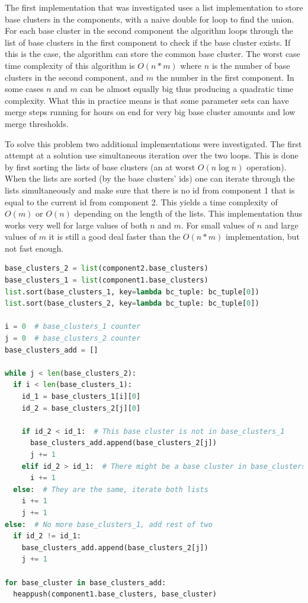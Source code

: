 The first implementation that was investigated uses a list implementation to store base clusters in the components, with a naive double for loop to find the union. For each base cluster in the second component the algorithm loops through the list of base clusters in the first component to check if the base cluster exists. If this is the case, the algorithm can store the common base cluster. The worst case time complexity of this algorithm is \(O(n*m)\) where \(n\) is the number of base clusters in the second component, and \(m\) the number in the first component. In some cases \(n\) and \(m\) can be almost equally big thus producing a quadratic time complexity. What this in practice means is that some parameter sets can have merge steps running for hours on end for very big base cluster amounts and low merge thresholds.

To solve this problem two additional implementations were investigated. The first attempt at a solution use simultaneous iteration over the two loops. This is done by first sorting the lists of base clusters (an at worst \(O(n \log n)\) operation). When the lists are sorted (by the base clusters' ids) one can iterate through the lists simultaneously and make sure that there is no id from component 1 that is equal to the current id from component 2. This yields a time complexity of \(O(m)\) or \(O(n)\) depending on the length of the lists. This implementation thus works very well for large values of both \(n\) and \(m\). For small values of \(n\) and large values of \(m\) it is still a good deal faster than the \(O(n*m)\) implementation, but not fast enough.

\begin{lstlisting}[float=ht, language=python, breaklines=true, label=lst:simultaneousmerge, caption={Simultaneous merge of components.}] 
base_clusters_2 = list(component2.base_clusters)
base_clusters_1 = list(component1.base_clusters)
list.sort(base_clusters_1, key=lambda bc_tuple: bc_tuple[0])
list.sort(base_clusters_2, key=lambda bc_tuple: bc_tuple[0])

i = 0  # base_clusters_1 counter
j = 0  # base_clusters_2 counter
base_clusters_add = []

while j < len(base_clusters_2):
  if i < len(base_clusters_1):
    id_1 = base_clusters_1[i][0]
    id_2 = base_clusters_2[j][0]

    if id_2 < id_1:  # This base cluster is not in base_clusters_1
      base_clusters_add.append(base_clusters_2[j])
      j += 1
    elif id_2 > id_1:  # There might be a base cluster in base_clusters_1
      i += 1
  else:  # They are the same, iterate both lists
    i += 1
    j += 1
else:  # No more base_clusters_1, add rest of two
  if id_2 != id_1:
    base_clusters_add.append(base_clusters_2[j])
    j += 1

for base_cluster in base_clusters_add:
  heappush(component1.base_clusters, base_cluster)
\end{lstlisting}
   

